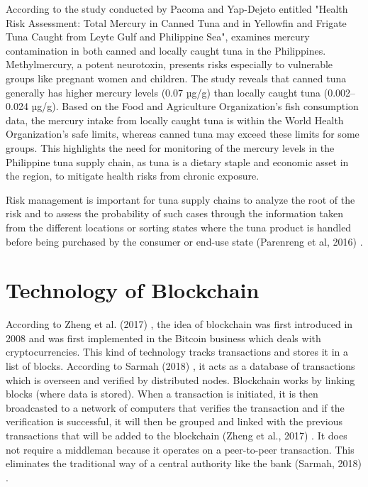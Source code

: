 According to the study conducted by Pacoma and Yap-Dejeto \nocite{rrl-FATS6} entitled "Health Risk Assessment: Total Mercury in Canned Tuna and in Yellowfin and Frigate Tuna Caught from Leyte Gulf and Philippine Sea", examines mercury contamination in both canned and locally caught tuna in the Philippines. Methylmercury, a potent neurotoxin, presents risks especially to vulnerable groups like pregnant women and children. The study reveals that canned tuna generally has higher mercury levels (0.07 µg/g) than locally caught tuna (0.002–0.024 µg/g). Based on the Food and Agriculture Organization’s fish consumption data, the mercury intake from locally caught tuna is within the World Health Organization’s safe limits, whereas canned tuna may exceed these limits for some groups. This highlights the need for monitoring of the mercury levels in the Philippine tuna supply chain, as tuna is a dietary staple and economic asset in the region, to mitigate health risks from chronic exposure.

Risk management is important for tuna supply chains to analyze the root of the risk and to assess the probability of such cases through the information taken from the different locations or sorting states where the tuna product is handled before being purchased by the consumer or end-use state (Parenreng et al, 2016) \nocite{rrl-FATSC7}.

\section{Technology of Blockchain}

According to Zheng et al. (2017) \nocite{rrl-ToB1}, the idea of blockchain was first introduced in 2008 and was first implemented in the Bitcoin business which deals with cryptocurrencies. This kind of technology tracks transactions and stores it in a list of blocks. According to Sarmah (2018) \nocite{rrl-ToB2}, it acts as a database of transactions which is overseen and verified by distributed nodes. Blockchain works by linking blocks (where data is stored). When a transaction is initiated, it is then broadcasted to a network of computers that verifies the transaction and if the verification is successful, it will then be grouped and linked with the previous transactions that will be added to the blockchain (Zheng et al., 2017) \nocite{rrl-ToB3}. It does not require a middleman because it operates on a peer-to-peer transaction. This eliminates the traditional way of a central authority like the bank (Sarmah, 2018) \nocite{rrl-ToB2}. 


